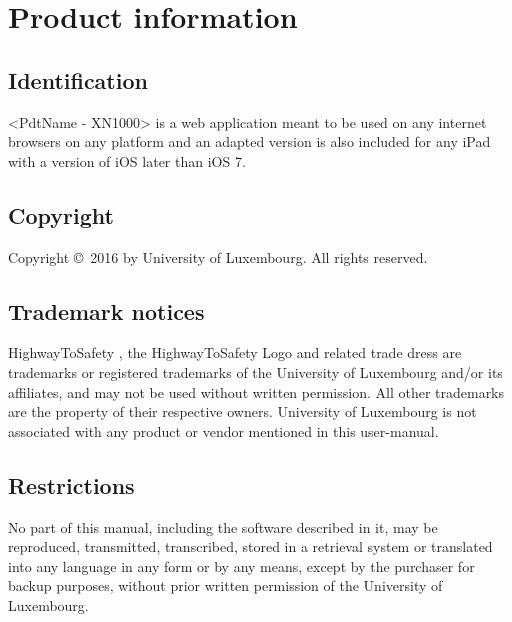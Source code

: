 \chapter{Product information}
\vspace{-6em}


\section{Identification}
<\gls{PdtName} - XN1000> is a web application meant to be used on any internet
browsers on any platform and an adapted version is also included for any iPad
with a version of iOS later than iOS 7.

\section{Copyright}
Copyright \copyright \ 2016 by University of Luxembourg. All rights reserved.

\section{Trademark notices}
HighwayToSafety \circledR, the HighwayToSafety Logo and related trade dress are
trademarks or registered trademarks of the University of Luxembourg and/or its
affiliates, and may not be used without written permission. All other trademarks
are the property of their respective owners. University of Luxembourg is not
associated with any product or vendor mentioned in this user-manual.

\section{Restrictions}
No part of this manual, including the software described in it, may be
reproduced, transmitted, transcribed, stored in a retrieval system or translated
into any language in any form or by any means, except by the purchaser for
backup purposes, without prior written permission of the University of
Luxembourg.

